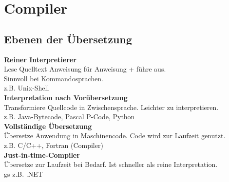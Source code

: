 

\section{Compiler}

\subsection{Ebenen der Übersetzung}
\textbf{Reiner Interpretierer}\\
Lese Quelltext Anweisung für Anweisung + führe aus.\\
Sinnvoll bei Kommandosprachen.\\
z.B. Unix-Shell\\

\textbf{Interpretation nach Vorübersetzung}\\
Transformiere Quellcode in Zwischensprache. Leichter zu interpretieren.\\
z.B. Java-Bytecode, Pascal P-Code, Python\\

\textbf{Vollständige Übersetzung}\\
Übersetze Anwendung in Maschinencode. Code wird zur Laufzeit genutzt.\\
z.B. C/C++, Fortran (Compiler)\\

\textbf{Just-in-time-Compiler}\\
Übersetze zur Laufzeit bei Bedarf. Ist schneller als reine Interpretation.\\ gs
z.B. .NET

